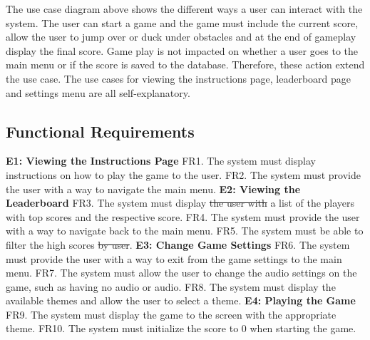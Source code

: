 \documentclass[12pt]{article}
\begin{document}
The use case diagram above shows the different ways a user can interact with the system. The user can start a game and the game must include the current score, allow the user to jump over or duck under obstacles and at the end of gameplay display the final score. Game play is not impacted on whether a user goes to the main menu or if the score is saved to the database. Therefore, these action extend the use case. The use cases for viewing the instructions page, leaderboard page and settings menu are all self-explanatory. 



\subsection{Functional Requirements}

\textbf{E1: Viewing the Instructions Page} \newline
FR1. The system must display instructions on how to play the game to the user. \newline
FR2. The system must provide the user with a way to navigate the main menu. \newline \newline
\textbf{E2: Viewing the Leaderboard} \newline
FR3. The system must display \sout{ the user with} a list of the players with top scores and the respective score.  \newline
FR4. The system must provide the user with a way to navigate back to the main menu. \newline
FR5. The system must be able to filter the high scores \sout{by user}. \newline \newline
\textbf{E3: Change Game Settings} \newline
FR6. The system must provide the user with a way to exit from the game settings to the main menu. \newline
FR7. The system must allow the user to change the audio settings on the game, such as having no audio or audio. \newline
FR8. The system must display the available themes and allow the user to select a theme. \newline \newline
\textbf{E4: Playing the Game} \newline
FR9. The system must display the game to the screen with the appropriate theme. \newline
FR10. The system must initialize the score to 0 when starting the game. \newline
\end{document}
